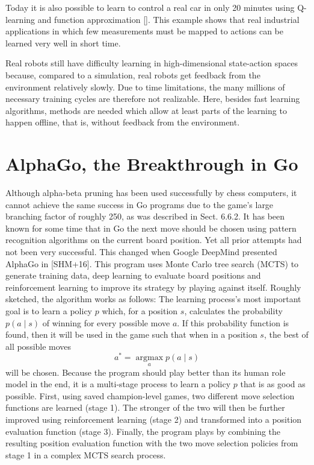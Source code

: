 \documentclass[10pt]{book}
\begin{document}
Today it is also possible to learn to control a real car in only 20 minutes using Q-learning and function approximation [\cite{riedmiller2007drive}]. This example shows that real industrial applications in which few measurements must be mapped to actions can be learned very well in short time.

Real robots still have difficulty learning in high-dimensional state-action spaces because, compared to a simulation, real robots get feedback from the environment relatively slowly. Due to time limitations, the many millions of necessary training cycles are therefore not realizable. Here, besides fast learning algorithms, methods are needed which allow at least parts of the learning to happen offline, that is, without feedback from the environment.

\section{AlphaGo, the Breakthrough in Go}
Although alpha-beta pruning has been used successfully by chess computers, it cannot achieve the same success in Go programs due to the game's large branching factor of roughly 250, as was described in Sect. 6.6.2. It has been known for some time that in Go the next move should be chosen using pattern recognition algorithms on the current board position. Yet all prior attempts had not been very successful. This changed when Google DeepMind presented AlphaGo in [SHM+16]. This program uses Monte Carlo tree search (MCTS) to generate training data, deep learning to evaluate board positions and reinforcement learning to improve its strategy by playing against itself. Roughly sketched, the algorithm works as follows:
The learning process's most important goal is to learn a policy $p$ which, for a position $s$, calculates the probability $p(a \mid s)$ of winning for every possible move $a$. If this probability function is found, then it will be used in the game such that when in a position $s$, the best of all possible moves
$$
a^{*}=\underset{a}{\operatorname{argmax}} p(a \mid s)
$$
will be chosen. Because the program should play better than its human role model in the end, it is a multi-stage process to learn a policy $p$ that is as good as possible. First, using saved champion-level games, two different move selection functions are learned (stage 1). The stronger of the two will then be further improved using reinforcement learning (stage 2) and transformed into a position evaluation function (stage 3). Finally, the program plays by combining the resulting position evaluation function with the two move selection policies from stage 1 in a complex MCTS search process.
\end{document}
